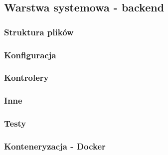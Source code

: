 \documentclass[../../main.tex]{subfiles}
\begin{document}
\subsection{Warstwa systemowa - backend}
    \subsubsection{Struktura plików}
    \subsubsection{Konfiguracja}
    \subsubsection{Kontrolery}
    \subsubsection{Inne}
    \subsubsection{Testy}
    \subsubsection{Konteneryzacja - Docker}
\end{document}
